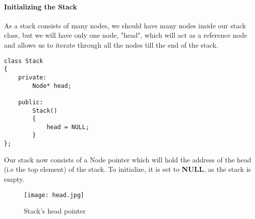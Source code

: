 \documentclass[11pt,fleqn]{book} %
\begin{document}
\paragraph{Initializing the Stack}
As a stack consists of many nodes, we should have many nodes inside our stack class, but we will have only one node, "head", which will act as a reference node and allows us to iterate through all the nodes till the end of the stack.

\begin{lstlisting}
class Stack
{
	private:
		Node* head;
		
	public:
		Stack()
		{
			head = NULL;
		}
};		

\end{lstlisting}
Our stack now consists of a Node pointer which will hold the address of the head (i.e the top element) of the stack. To initialize, it is set to \textbf{NULL}, as the stack is empty.
\begin{figure}[H]
	\centering
	\texttt{[image: head.jpg]}
	\caption{Stack's head pointer}
\end{figure}
\end{document}

